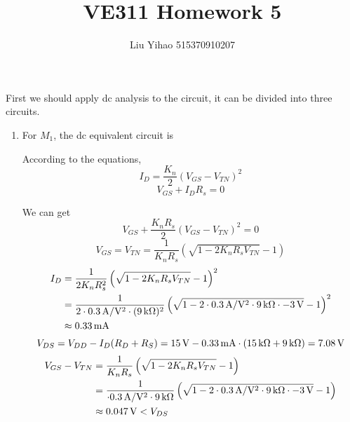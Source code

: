 \documentclass{article}
\title{VE311 Homework 5}
\author{Liu Yihao 515370910207}
\date{}
\newcommand{\unit}[1]{{\rm\,#1}}
\begin{document}
\maketitle

\section{}
First we should apply dc analysis to the circuit, it can be divided into three circuits.

\begin{enumerate}[(1)]
\item For $M_1$, the dc equivalent circuit is
\begin{center}
\end{center}

According to the equations,
$$I_D=\frac{K_n}{2}(V_{GS}-V_{TN})^2$$
$$V_{GS}+I_DR_s=0$$

We can get $$V_{GS}+\frac{K_nR_s}{2}(V_{GS}-V_{TN})^2=0$$
$$V_{GS}=V_{TN}=\frac{1}{K_nR_s}\left(\sqrt{1-2K_nR_sV_{TN}}-1\right)$$
\begin{align*}
I_D&=\frac{1}{2K_nR_s^2}\left(\sqrt{1-2K_nR_sV_{TN}}-1\right)^2\\
&=\frac{1}{2\cdot0.3\unit{A/V^2}\cdot(9\unit{k\Omega})^2}\left(\sqrt{1-2\cdot0.3\unit{A/V^2}\cdot9\unit{k\Omega}\cdot-3\unit{V}}-1\right)^2\\
&\approx0.33\unit{mA}
\end{align*}
$$V_{DS}=V_{DD}-I_D(R_D+R_S)=15\unit{V}-0.33\unit{mA}\cdot(15\unit{k\Omega}+9\unit{k\Omega})=7.08\unit{V}$$
\begin{align*}
V_{GS}-V_{TN}&=\frac{1}{K_nR_s}\left(\sqrt{1-2K_nR_sV_{TN}}-1\right)\\
&=\frac{1}{\cdot0.3\unit{A/V^2}\cdot9\unit{k\Omega}}\left(\sqrt{1-2\cdot0.3\unit{A/V^2}\cdot9\unit{k\Omega}\cdot-3\unit{V}}-1\right)\\
&\approx0.047\unit{V}<V_{DS}
\end{align*}


\end{enumerate}
\end{document}
